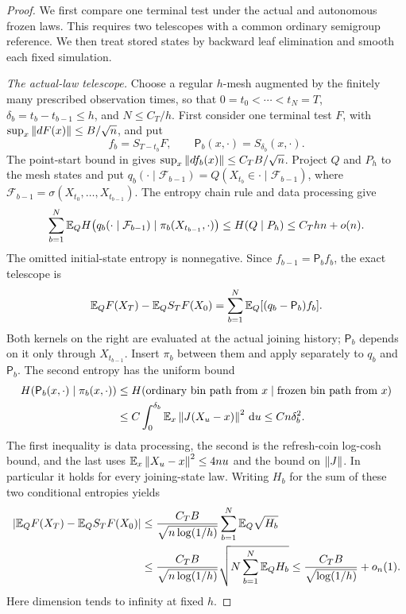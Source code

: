 \begin{proof}
We first compare one terminal test under the actual and autonomous
frozen laws.  This requires two telescopes with a common ordinary
semigroup reference.  We then treat stored states by backward leaf
elimination and smooth each fixed simulation.

\emph{The actual-law telescope.}
Choose a regular $h$-mesh augmented by the finitely many prescribed
observation times, so that $0=t_0<\cdots<t_N=T$,
$\delta_b=t_b-t_{b-1}\le h$, and $N\le C_T/h$.
First consider one terminal test $F$, with
$\sup_x\left\lVert dF(x)\right\rVert\le B/\sqrt n$, and put
\[
 f_b=S_{T-t_b}F,\qquad
 \mathsf P_b(x,\cdot)=S_{\delta_b}(x,\cdot).
\]
The point-start bound in  gives
$\sup_x\left\lVert df_b(x)\right\rVert\le C_TB/\sqrt n$.
Project $Q$ and $P_h$ to the mesh states and put
$q_b(\cdot\mid\mathcal F_{b-1})
 =Q(X_{t_b}\in\cdot\mid\mathcal F_{b-1})$, where
$\mathcal F_{b-1}=\sigma(X_{t_0},\ldots,X_{t_{b-1}})$.
The entropy chain rule and data processing give
\[
 \sum_{b=1}^N\mathbb E_Q
 H\!\left(q_b(\cdot\mid\mathcal F_{b-1})
       \mid\pi_b(X_{t_{b-1}},\cdot)\right)
 \le H(Q\mid P_h)\le C_Thn+o(n).
\]
The omitted initial-state entropy is nonnegative.
Since $f_{b-1}=\mathsf P_bf_b$, the exact telescope is
\begin{equation}
 \mathbb E_QF(X_T)-\mathbb E_Q S_TF(X_0)
 =\sum_{b=1}^N\mathbb E_Q[(q_b-\mathsf P_b)f_b].
 \label{eq:path-actual-telescope}
\end{equation}
Both kernels on the right are evaluated at the actual joining
history; $\mathsf P_b$ depends on it only through $X_{t_{b-1}}$.
Insert $\pi_b$ between them and apply
 separately to $q_b$ and $\mathsf P_b$.
The second entropy has the uniform bound
\begin{align*}
 H(\mathsf P_b(x,\cdot)\mid\pi_b(x,\cdot))
 &\le H(\text{ordinary bin path from }x
                  \mid\text{frozen bin path from }x)\\
 &\le C\int_0^{\delta_b}\mathbb E_x\left\lVert J(X_u-x)\right\rVert^2\,\mathrm d u
 \le Cn\delta_b^2.
\end{align*}
The first inequality is data processing, the second is the
refresh-coin log-cosh bound, and the last uses
$\mathbb E_x\left\lVert X_u-x\right\rVert^2\le4nu$ and the bound on $\left\lVert J\right\rVert$.
In particular it holds for every joining-state law.
Writing $H_b$ for the sum of these two conditional entropies yields
\begin{align*}
 |\mathbb E_QF(X_T)-\mathbb E_Q S_TF(X_0)|
 &\le\frac{C_TB}{\sqrt{n\log(1/h)}}
       \sum_{b=1}^N\mathbb E_Q\sqrt{H_b}\\
 &\le\frac{C_TB}{\sqrt{n\log(1/h)}}
       \sqrt{N\sum_{b=1}^N\mathbb E_QH_b}
 \le\frac{C_TB}{\sqrt{\log(1/h)}}+o_n(1).
\end{align*}
Here dimension tends to infinity at fixed $h$.


\end{proof}
